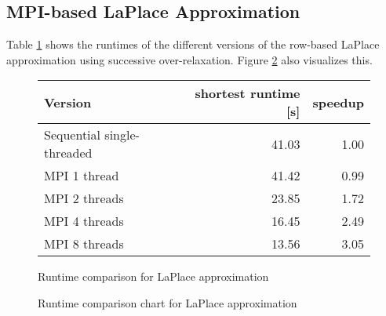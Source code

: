 \documentclass[]{article}
\begin{document}
\subsection{MPI-based LaPlace Approximation}

 Table \ref{tab:laplace-sor-runtime} shows the runtimes of the different versions of the row-based LaPlace approximation using successive over-relaxation. Figure \ref{fig:laplace-sor-chart} also visualizes this.

\begin{figure}[h]
	\centering
	\begin{tabular}{|l|r|r|}
		\hline
		\textbf{Version} & \textbf{shortest runtime [s]} & \textbf{speedup} \\
		\hline
		Sequential single-threaded	& 41.03 & 1.00 \\ 
		\hline 
		MPI 1 thread				& 41.42 & 0.99 \\ 
		\hline 
		MPI 2 threads				& 23.85 & 1.72 \\ 
		\hline 
		MPI 4 threads 				& 16.45 & 2.49 \\ 
		\hline 
		MPI 8 threads				& 13.56 & 3.05 \\ 
		\hline 
	\end{tabular} 
	\caption{Runtime comparison for LaPlace approximation}
	\label{tab:laplace-sor-runtime}
\end{figure}

\begin{figure}[h]
	\centering
	\caption{Runtime comparison chart for LaPlace approximation}
	\label{fig:laplace-sor-chart}
\end{figure}

\FloatBarrier
\clearpage
\end{document}

